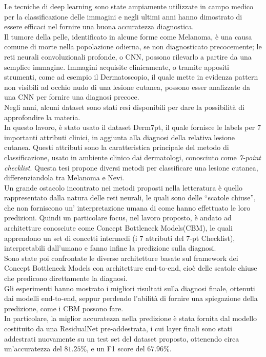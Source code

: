 \documentclass[a4print,english,lof,lot,twoside]{univpmthesis}
\begin{document}
\begin{thesisabstract}[italian]
Le tecniche di deep learning sono state ampiamente utilizzate in campo medico per la classificazione delle immagini e negli ultimi anni hanno dimostrato di essere efficaci nel fornire una buona accuratezza diagnostica. \\
Il tumore della pelle, identificato in alcune forme come Melanoma, è una causa comune di morte nella popolazione odierna, se non diagnosticato precocemente; le reti neurali convoluzionali profonde, o CNN, possono rilevarlo a partire da una semplice immagine. 
Immagini acquisite clinicamente, o tramite appositi strumenti, come ad esempio il Dermatoscopio, il quale mette in evidenza pattern non visibili ad occhio nudo di una lesione cutanea, possono esser analizzate da una CNN per fornire una diagnosi precoce.\\
Negli anni, alcuni dataset sono stati resi disponibili per dare la possibilità di approfondire la materia.\\
In questo lavoro, è stato usato il dataset Derm7pt, il quale fornisce le labels per 7 importanti attributi clinici, in aggiunta alla diagnosi della  relativa lesione cutanea. Questi attributi sono la caratteristica principale del metodo di classificazione, usato in ambiente clinico dai dermatologi, conosciuto come \textit{7-point checklist}.
Questa tesi propone diversi metodi per classificare una lesione cutanea, differenziandola tra Melanoma e Nevi.\\
Un grande ostacolo incontrato nei metodi proposti nella letteratura è quello rappresentato dalla natura delle reti neurali, le quali sono delle “scatole chiuse”, che non forniscono un’ interpretazione umana di come hanno effettuato le loro predizioni. Quindi un particolare focus, nel lavoro proposto, è andato ad architetture conosciute come Concept Bottleneck Models(CBM), le quali apprendono un set di concetti intermedi (i 7 attributi del 7-pt Checklist), interpretabili dall’umano e fanno infine la predizione sulla diagnosi.\\
Sono state poi confrontate le diverse architetture basate sul framework dei Concept Bottleneck Models con architetture end-to-end, cioè delle scatole chiuse che predicono direttamente la diagnosi.\\
Gli esperimenti hanno mostrato i migliori risultati sulla diagnosi finale, ottenuti dai modelli end-to-end, seppur perdendo l’abilità di fornire una spiegazione della predizione, come i CBM possono fare.\\
In particolare, la miglior accuratezza nella predizione è stata fornita dal modello costituito da una ResidualNet pre-addestrata, i cui layer finali sono stati addestrati nuovamente su un test set del dataset proposto, ottenendo circa un'accuratezza del $81.25\%$, e un F1 score del $67.96\%$.\\

\end{thesisabstract}
\end{document}
